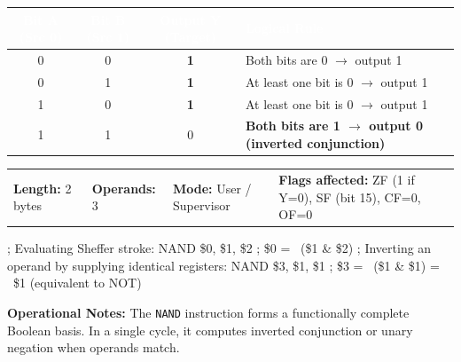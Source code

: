 \documentclass[11pt,a4paper]{article}
\newcommand{\reg}{\$}
\renewcommand{\arraystretch}{1.25}
\begin{document}
\vspace{0.5mm}
\par\vspace{0.8mm}
\noindent
{\footnotesize\renewcommand{\arraystretch}{1.1}%
\begin{tabularx}{\textwidth}{@{} c c c X @{}}
\toprule
\rowcolor{limslate}
\textcolor{white}{\textbf{Bit A (Src 0)}} & \textcolor{white}{\textbf{Bit B (Src 1)}} & \textcolor{white}{\textbf{Output Y (Target)}} & \textcolor{white}{\textbf{Logical Rule}} \\
\midrule
0 & 0 & \textbf{1} & Both bits are 0 $\rightarrow$ output 1 \\
\rowcolor{limroweven}
0 & 1 & \textbf{1} & At least one bit is 0 $\rightarrow$ output 1 \\
1 & 0 & \textbf{1} & At least one bit is 0 $\rightarrow$ output 1 \\
\rowcolor{limorangelight}
1 & 1 & 0 & \textbf{Both bits are 1 $\rightarrow$ output 0 (inverted conjunction)} \\
\bottomrule
\end{tabularx}%
}
\vspace{1mm}

\begin{tcolorbox}[
    enhanced,
    colback=limcard,
    colframe=limborder,
    boxrule=0.6pt,
    arc=3pt,
    left=8pt,right=8pt,top=4pt,bottom=4pt
]
    \footnotesize
    \noindent
    \begin{tabularx}{\textwidth}{@{}l l l X@{}}
        \textbf{Length:} 2 bytes &
        \textbf{Operands:} 3 &
        \textbf{Mode:} User / Supervisor &
        \textbf{Flags affected:} ZF (1 if Y=0), SF (bit 15), CF=0, OF=0
    \end{tabularx}
\end{tcolorbox}

\begin{examplebox}[title={Usage Example (LIM2 Assembly)},top=4pt,bottom=4pt]
\begin{limasm}
; Evaluating Sheffer stroke:
NAND \reg0, \reg1, \reg2        ; \reg0 = ~(\reg1 & \reg2)
; Inverting an operand by supplying identical registers:
NAND \reg3, \reg1, \reg1        ; \reg3 = ~(\reg1 & \reg1) = ~\reg1 (equivalent to NOT)
\end{limasm}
\vspace{1mm}
\footnotesize\color{limmuted}
\textbf{Operational Notes:} The \texttt{NAND} instruction forms a functionally complete Boolean basis. In a single cycle, it computes inverted conjunction or unary negation when operands match.
\end{examplebox}
\end{document}
